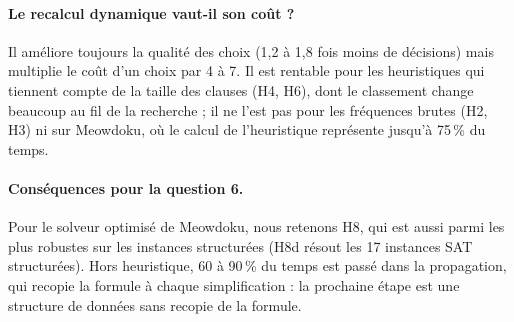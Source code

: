 \documentclass[11pt,a4paper]{article}
\begin{document}
\paragraph{Le recalcul dynamique vaut-il son coût ?} Il améliore toujours
la qualité des choix (1,2 à 1,8 fois moins de décisions) mais multiplie
le coût d'un choix par 4 à 7. Il est rentable pour les heuristiques qui
tiennent compte de la taille des clauses (H4, H6), dont le classement
change beaucoup au fil de la recherche ; il ne l'est pas pour les
fréquences brutes (H2, H3) ni sur Meowdoku, où le calcul de l'heuristique
représente jusqu'à 75\,\% du temps.

\paragraph{Conséquences pour la question 6.} Pour le solveur optimisé de
Meowdoku, nous retenons H8, qui est aussi parmi les plus robustes sur les
instances structurées (H8d résout les 17 instances SAT structurées).
Hors heuristique, 60 à 90\,\% du temps est passé dans la propagation, qui
recopie la formule à chaque simplification : la prochaine étape est une
structure de données sans recopie de la formule.
\end{document}
